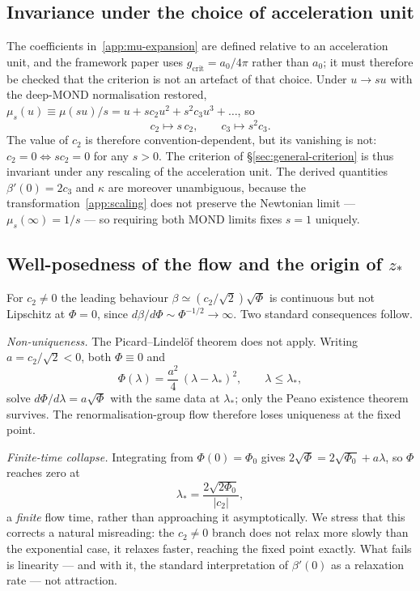 \documentclass[11pt]{article}
\theoremstyle{plain}
\begin{document}
\subsection{Invariance under the choice of acceleration unit}
\label{app:invariance}

The coefficients in~\eqref{app:mu-expansion} are defined relative to an
acceleration unit, and the framework paper uses $g_{\mathrm{crit}}=a_{0}/4\pi$
rather than $a_{0}$; it must therefore be checked that the criterion is not an
artefact of that choice. Under $u\to su$ with the deep-MOND normalisation
restored, $\mu_{s}(u)\equiv\mu(su)/s = u + sc_{2}u^{2} + s^{2}c_{3}u^{3}+\dots$,
so
\begin{equation}
c_{2}\longmapsto s\,c_{2},
\qquad
c_{3}\longmapsto s^{2}c_{3}.
\label{app:scaling}
\end{equation}
The value of $c_{2}$ is therefore convention-dependent, but its vanishing is
not: $c_{2}=0\Leftrightarrow sc_{2}=0$ for any $s>0$. The criterion of
\S\ref{sec:general-criterion} is thus invariant under any rescaling of the
acceleration unit. The derived quantities $\beta'(0)=2c_{3}$ and $\kappa$ are
moreover unambiguous, because the transformation~\eqref{app:scaling} does not
preserve the Newtonian limit --- $\mu_{s}(\infty)=1/s$ --- so requiring both
MOND limits fixes $s=1$ uniquely.

\subsection{Well-posedness of the flow and the origin of \texorpdfstring{$z_{*}$}{z*}}
\label{app:wellposedness}

For $c_{2}\neq0$ the leading behaviour $\beta\simeq(c_{2}/\sqrt2)\sqrt{\Phi}$
is continuous but not Lipschitz at $\Phi=0$, since
$d\beta/d\Phi\sim\Phi^{-1/2}\to\infty$. Two standard consequences follow.

\emph{Non-uniqueness.} The Picard--Lindel\"of theorem does not apply. Writing
$a=c_{2}/\sqrt2<0$, both $\Phi\equiv0$ and
\begin{equation}
\Phi(\lambda)=\frac{a^{2}}{4}\,(\lambda-\lambda_{*})^{2},
\qquad \lambda\le\lambda_{*},
\label{app:peano}
\end{equation}
solve $d\Phi/d\lambda=a\sqrt{\Phi}$ with the same data at $\lambda_{*}$; only
the Peano existence theorem survives. The renormalisation-group flow therefore
loses uniqueness at the fixed point.

\emph{Finite-time collapse.} Integrating from $\Phi(0)=\Phi_{0}$ gives
$2\sqrt{\Phi}=2\sqrt{\Phi_{0}}+a\lambda$, so $\Phi$ reaches zero at
\begin{equation}
\lambda_{*}=\frac{2\sqrt{2\Phi_{0}}}{|c_{2}|},
\label{app:lambda-star}
\end{equation}
a \emph{finite} flow time, rather than approaching it asymptotically. We stress
that this corrects a natural misreading: the $c_{2}\neq0$ branch does not
relax more slowly than the exponential case, it relaxes faster, reaching the
fixed point exactly. What fails is linearity --- and with it, the standard
interpretation of $\beta'(0)$ as a relaxation rate --- not attraction.
\end{document}
